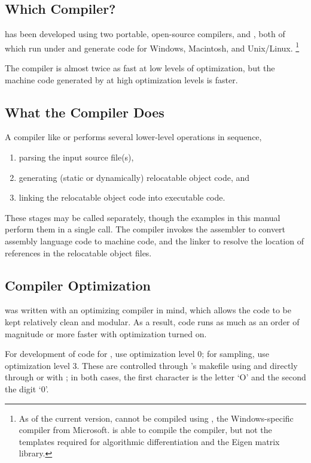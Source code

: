 \subsection{Which Compiler?}

\Stan has been developed using two portable, open-source \Cpp
compilers, \gpp and \clang, both of which run under and generate code
for Windows, Macintosh, and Unix/Linux.%
%
\footnote{As of the current version, \Stan cannot be compiled using
  \MSVC, the Windows-specific compiler from Microsoft.  \MSVC is able
  to compile the  compiler, but not the templates required
  for algorithmic differentiation and the Eigen matrix library.}

The \clang compiler is almost twice as fast at low levels of
optimization, but the machine code generated by \gpp at high
optimization levels is faster.


\subsection{What the Compiler Does}

A \Cpp compiler like \gpp or \clang performs several lower-level
operations in sequence,
% 
\begin{enumerate}
\item
parsing the input \Cpp source file(s), 
\item 
generating (static or dynamically) relocatable object code, and
\item 
linking the relocatable object code into executable code.
\end{enumerate}
%
These stages may be called separately, though the examples in this
manual perform them in a single call.  The compiler invokes the
assembler to convert assembly language code to machine code, and the
linker to resolve the location of references in the relocatable object
files.

\subsection{Compiler Optimization}

\Stan was written with an optimizing compiler in mind, which allows
the code to be kept relatively clean and modular.  As a result, \Stan
code runs as much as an order of magnitude or more faster with
optimization turned on.

For development of \Cpp code for \Stan, use optimization level 0; for
sampling, use optimization level 3.  These are controlled through
\Stan's makefile using  and directly through \clang or \gpp
with ; in both cases, the first character is the letter `O'
and the second the digit `0'.


